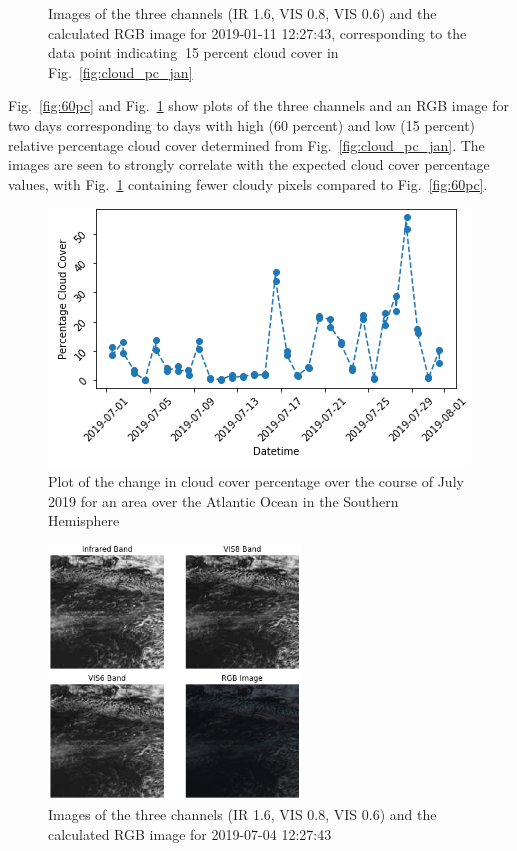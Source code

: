 \begin{figure}[!hbt]
\begin{minipage}{0.48\textwidth}
        \caption{Images of the three channels (IR 1.6, VIS 0.8, VIS 0.6) and the calculated RGB image for 2019-01-11 12:27:43, corresponding to the data point indicating $~$15 percent cloud cover in Fig.~\ref{fig:cloud_pc_jan}}
        \label{fig:15pc}
    \end{minipage}
\end{figure}

Fig.~\ref{fig:60pc} and Fig.~\ref{fig:15pc} show plots of the three channels and an RGB image for two days corresponding to days with high (60 percent) and low (15 percent) relative percentage cloud cover determined from Fig.~\ref{fig:cloud_pc_jan}. The images are seen to strongly correlate with the expected cloud cover percentage values, with Fig.~\ref{fig:15pc} containing fewer cloudy pixels compared to Fig.~\ref{fig:60pc}.

\begin{figure}[hbt!]
    \centering
    \includegraphics[totalheight=0.3\textheight]{cloud_percent_jul_southsea_not.png}
    \caption{Plot of the change in cloud cover percentage over the course of July 2019 for an area over the Atlantic Ocean in the Southern Hemisphere}
    \label{fig:cloud_pc_jul}
\end{figure}

\begin{figure}[hbt!]
    \centering
    \includegraphics[width=0.6\textwidth]{0_per_day_sea_not.png}
    \caption{Images of the three channels (IR 1.6, VIS 0.8, VIS 0.6) and the calculated RGB image for 2019-07-04 12:27:43}
    \label{fig:0pc}
\end{figure}

